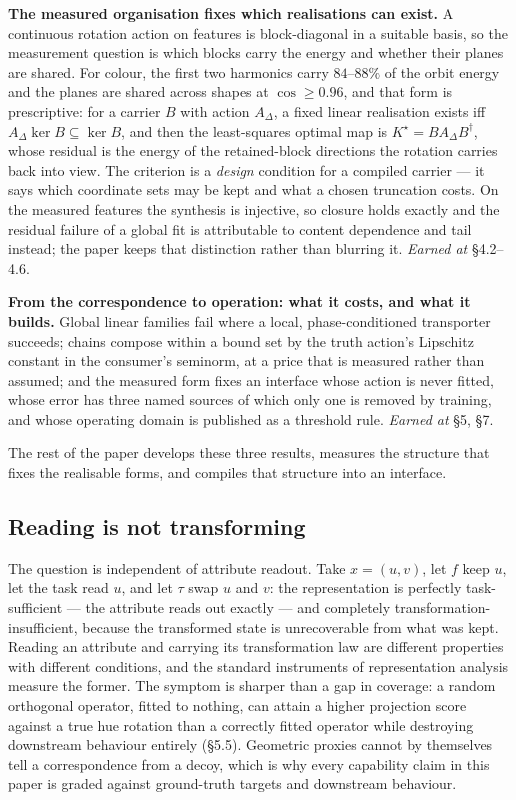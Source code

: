 \textbf{The measured organisation fixes which realisations can exist.} A continuous rotation action on features is block-diagonal in a suitable basis, so the measurement question is which blocks carry the energy and whether their planes are shared. For colour, the first two harmonics carry $84$--$88\%$ of the orbit energy and the planes are shared across shapes at $\cos\ge0.96$, and that form is prescriptive: for a carrier $B$ with action $A_\Delta$, a fixed linear realisation exists iff $A_\Delta\ker B\subseteq\ker B$, and then the least-squares optimal map is $K^\star=BA_\Delta B^\dagger$, whose residual is the energy of the retained-block directions the rotation carries back into view. The criterion is a \textit{design} condition for a compiled carrier --- it says which coordinate sets may be kept and what a chosen truncation costs. On the measured features the synthesis is injective, so closure holds exactly and the residual failure of a global fit is attributable to content dependence and tail instead; the paper keeps that distinction rather than blurring it. \textit{Earned at} \S{}4.2--4.6.

\textbf{From the correspondence to operation: what it costs, and what it builds.} Global linear families fail where a local, phase-conditioned transporter succeeds; chains compose within a bound set by the truth action's Lipschitz constant in the consumer's seminorm, at a price that is measured rather than assumed; and the measured form fixes an interface whose action is never fitted, whose error has three named sources of which only one is removed by training, and whose operating domain is published as a threshold rule. \textit{Earned at} \S{}5, \S{}7.

The rest of the paper develops these three results, measures the structure that fixes the realisable forms, and compiles that structure into an interface.

\subsection{Reading is not transforming}

The question is independent of attribute readout. Take $x=(u,v)$, let $f$ keep $u$, let the task read $u$, and let $\tau$ swap $u$ and $v$: the representation is perfectly task-sufficient --- the attribute reads out exactly --- and completely transformation-insufficient, because the transformed state is unrecoverable from what was kept. Reading an attribute and carrying its transformation law are different properties with different conditions, and the standard instruments of representation analysis measure the former. The symptom is sharper than a gap in coverage: a random orthogonal operator, fitted to nothing, can attain a higher projection score against a true hue rotation than a correctly fitted operator while destroying downstream behaviour entirely (\S{}5.5). Geometric proxies cannot by themselves tell a correspondence from a decoy, which is why every capability claim in this paper is graded against ground-truth targets and downstream behaviour.

